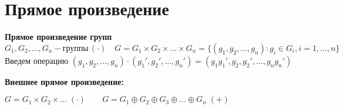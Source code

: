 \documentclass[12pt]{article}
\begin{document}
		
		
		\newpage
		\section{Прямое произведение}
		
			\begin{Def}
				\textbf{Прямое произведение групп} \\
				$G_1, G_2, \dots , G_n - \text{группы} \, (\cdot) \quad G=G_1\times G_2 \times \dots \times G_n=\{ (g_1,g_2, \dots , g_n):g_i\in G_i, i=1, \dots , n  \}$ \\
				Введем операцию $(g_1,g_2, \dots , g_n) \cdot (g_1',g_2', \dots , g_n')=(g_1 g_1', g_2, g_2', \dots, g_n g_n') $
			\end{Def}
		
		\hypertarget{def:out_comp}{\textbf{Внешнее прямое произведение:}} $G=G_1 \times G_2 \times \dots \; (\cdot) \qquad G=G_1\oplus G_2 \oplus G_3 \oplus \dots \oplus G_n \; (+)$
		
\end{document}
